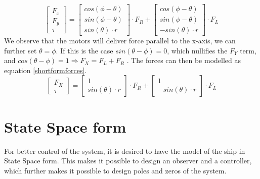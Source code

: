 \begin{equation}
\left[
\begin{matrix}
F_x\\
F_y\\
\tau
\end{matrix}
\right]
 =
 \left[
\begin{matrix}
cos(\phi - \theta)\\
sin(\phi - \theta)\\
sin(\theta) \cdot r
\end{matrix}
\right]
\cdot F_R
+
 \left[
\begin{matrix}
cos(\phi - \theta)\\
sin(\phi - \theta)\\
-sin(\theta) \cdot r
\end{matrix}
\right]
\cdot
F_L
\label{Forceequation}
\end{equation}
We observe that the motors will deliver force parallel to the x-axis, we can further set $\theta = \phi$. If this is the case $sin(\theta - \phi)=0$, which nullifies the $F_Y$ term, and $cos(\theta-\phi) = 1 \Longrightarrow F_X = F_L+F_R$ . The forces can then be modelled as equation \eqref{shortformforces}.
\begin{equation}
\left[\begin{matrix}
F_X\\
\tau
\end{matrix}
\right]
= 
\left[
\begin{matrix}
1\\
sin(\theta)\cdot r
\end{matrix}
\right]
\cdot F_R
+ 
\left[
\begin{matrix}
1\\
-sin(\theta)\cdot r
\end{matrix}
\right]
\cdot F_L
\label{shortformforces}
\end{equation}

\section{State Space form}
For better control of the system, it is desired to have the model of the ship in State Space form. This makes it possible to design an observer and a controller, which further makes it possible to design poles and zeros of the system.

